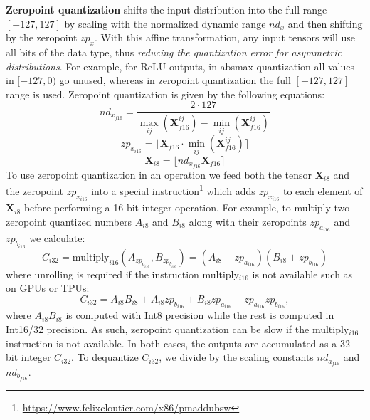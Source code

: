 \documentclass{article}
\begin{document}
\textbf{Zeropoint quantization} shifts the input distribution into the full range $[-127, 127]$ by scaling with the normalized dynamic range $nd_x$ and then shifting by the zeropoint $zp_x$. With this affine transformation, any input tensors will use all bits of the data type, thus {\it reducing the quantization error for asymmetric distributions}. For example, for ReLU outputs, in absmax quantization all values in $[-127, 0)$ go unused, whereas in zeropoint quantization the full $[-127, 127]$ range is used. Zeropoint quantization is given by the following equations:
\begin{equation}
nd_{x_{f16}} = \dfrac{2\cdot 127}{\max\limits_{ij}(\mathbf{X}_{f16}^{ij}) - \min\limits_{ij}(\mathbf{X}_{f16}^{ij})}
\end{equation}
\begin{equation}
zp_{x_{i16}} = \bigl\lfloor{\mathbf{X}_{f16} \cdot \min\limits_{ij}(\mathbf{X}_{f16}^{ij})\bigr\rceil}
\end{equation}
\begin{equation}
\mathbf{X}_{i8} = \bigl\lfloor{{nd_{x_{f16}} \mathbf{X}_{f16}}\bigr\rceil}
\end{equation}
To use zeropoint quantization in an operation we feed both the tensor $\mathbf{X}_{i8}$ and the zeropoint $zp_{x_{i16}}$ into a special instruction\footnote{\url{https://www.felixcloutier.com/x86/pmaddubsw}} which adds $zp_{x_{i16}}$ to each element of $\mathbf{X}_{i8}$ before performing a 16-bit integer operation. For example, to multiply two zeropoint quantized numbers $A_{i8}$ and $B_{i8}$ along with their zeropoints $zp_{a_{i16}}$ and $zp_{b_{i16}}$ we calculate:
\begin{equation}
C_{i32}  = \text{multiply}_{i16}({A}_{zp_{a_{i16}}},{B}_{zp_{b_{i16}}}) = ({A}_{i8}+zp_{a_{i16}})({B}_{i8}+zp_{b_{i16}})
\end{equation}
where unrolling is required if the instruction multiply$_{i16}$ is not available such as on GPUs or TPUs:
\begin{equation}
C_{i32}= {A}_{i8}{B}_{i8} + {A}_{i8}zp_{b_{i16}} + {B}_{i8}zp_{a_{i16}} + zp_{a_{i16}}zp_{b_{i16}},
\end{equation}
where $A_{i8}B_{i8}$ is computed with Int8 precision while the rest is computed in Int16/32 precision. As such, zeropoint quantization can be slow if the multiply$_{i16}$ instruction is not available. In both cases, the outputs are accumulated as a 32-bit integer $C_{i32}$. To dequantize $C_{i32}$, we divide by the scaling constants $nd_{a_{f16}}$ and $nd_{b_{f16}}$.
\end{document}
